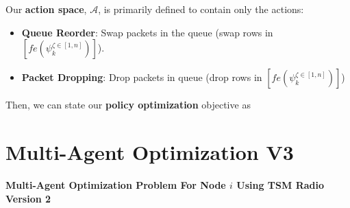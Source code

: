 \documentclass{article}
\begin{document}
Our \textbf{action space}, $\mathcal{A}$, is primarily defined to contain only the actions:

\begin{itemize}
    \item \textbf{Queue Reorder}: Swap packets in the queue (swap rows in $[fe(\psi_{k}^{\zeta \in [1, n]})]$).
    \item \textbf{Packet Dropping}: Drop packets in queue (drop rows in $[fe(\psi_{k}^{\zeta \in [1, n]})]$)
\end{itemize}

\vspace{0.5 cm}

Then, we can state our \textbf{policy optimization} objective as
\\
\noindent{}

\newpage

\section{Multi-Agent Optimization V3}

\noindent \textbf{Multi-Agent Optimization Problem For Node $i$ Using TSM Radio Version 2}
\\
\noindent{}

\vspace{1 cm}
\end{document}
